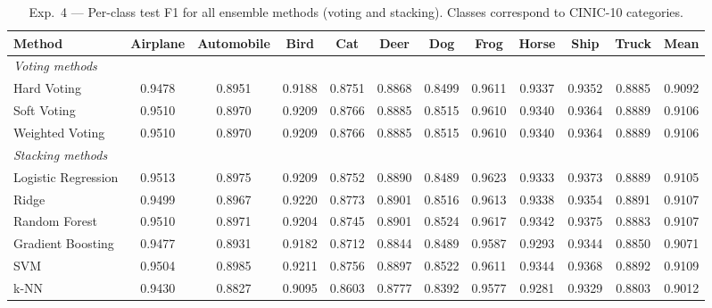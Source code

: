 \begin{table}[H]
\centering
\caption{Exp.\ 4 — Per-class test F1 for all ensemble methods (voting and stacking). Classes correspond to CINIC-10 categories.}
\label{tab:exp4_perclass}
\small
\begin{tabular}{lccccccccccc}
\toprule
\textbf{Method} & \textbf{Airplane} & \textbf{Automobile} & \textbf{Bird} & \textbf{Cat} & \textbf{Deer} & \textbf{Dog} & \textbf{Frog} & \textbf{Horse} & \textbf{Ship} & \textbf{Truck} & \textbf{Mean} \\
\midrule
\multicolumn{12}{l}{\textit{Voting methods}} \\
\midrule
Hard Voting & 0.9478 & 0.8951 & 0.9188 & 0.8751 & 0.8868 & 0.8499 & 0.9611 & 0.9337 & 0.9352 & 0.8885 & 0.9092 \\
Soft Voting & 0.9510 & 0.8970 & 0.9209 & 0.8766 & 0.8885 & 0.8515 & 0.9610 & 0.9340 & 0.9364 & 0.8889 & 0.9106 \\
Weighted Voting & 0.9510 & 0.8970 & 0.9209 & 0.8766 & 0.8885 & 0.8515 & 0.9610 & 0.9340 & 0.9364 & 0.8889 & 0.9106 \\
\midrule
\multicolumn{12}{l}{\textit{Stacking methods}} \\
\midrule
Logistic Regression & 0.9513 & 0.8975 & 0.9209 & 0.8752 & 0.8890 & 0.8489 & 0.9623 & 0.9333 & 0.9373 & 0.8889 & 0.9105 \\
Ridge & 0.9499 & 0.8967 & 0.9220 & 0.8773 & 0.8901 & 0.8516 & 0.9613 & 0.9338 & 0.9354 & 0.8891 & 0.9107 \\
Random Forest & 0.9510 & 0.8971 & 0.9204 & 0.8745 & 0.8901 & 0.8524 & 0.9617 & 0.9342 & 0.9375 & 0.8883 & 0.9107 \\
Gradient Boosting & 0.9477 & 0.8931 & 0.9182 & 0.8712 & 0.8844 & 0.8489 & 0.9587 & 0.9293 & 0.9344 & 0.8850 & 0.9071 \\
SVM & 0.9504 & 0.8985 & 0.9211 & 0.8756 & 0.8897 & 0.8522 & 0.9611 & 0.9344 & 0.9368 & 0.8892 & 0.9109 \\
k-NN & 0.9430 & 0.8827 & 0.9095 & 0.8603 & 0.8777 & 0.8392 & 0.9577 & 0.9281 & 0.9329 & 0.8803 & 0.9012 \\
\midrule
\bottomrule
\end{tabular}
\end{table}
